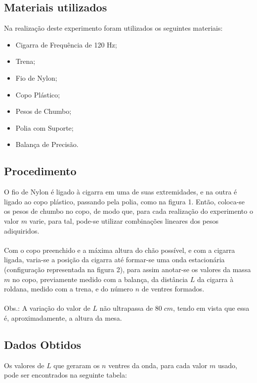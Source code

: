 \documentclass[12pt,a4paper]{article}
\begin{document}
\subsection{Materiais utilizados}
Na realização deste experimento foram utilizados os seguintes materiais:
\begin{itemize}
	\item Cigarra de Frequência de 120 Hz;
	\item Trena;
	\item Fio de Nylon;
	\item Copo Plástico;
	\item Pesos de Chumbo;
	\item Polia com Suporte;
	\item Balança de Precisão.
\end{itemize}

\subsection{Procedimento}
O fio de Nylon é ligado à cigarra em uma de suas extremidades, e na outra é ligado ao copo plástico, passando pela polia, como na figura 1. Então, coloca-se os pesos de chumbo no copo, de modo que, para cada realização do experimento o valor $m$ varie, para tal, pode-se utilizar combinações lineares dos pesos adiquiridos. \\\\
Com o copo preenchido e a máxima altura do chão possível, e com a cigarra ligada, varia-se a posição da cigarra até formar-se uma onda estacionária (configuração representada na figura 2), para assim anotar-se os valores da massa $m$ no copo, previamente medido com a balança, da distância $L$ da cigarra à roldana, medido com a trena, e do número $n$ de ventres formados. \\\\
Obs.: A variação do valor de $L$ não ultrapassa de $80 \; cm$, tendo em vista que essa é, aproximadamente, a altura da mesa.


\subsection{Dados Obtidos}
Os valores de $L$ que geraram os $n$ ventres da onda, para cada valor $m$ usado, pode ser encontrados na seguinte tabela:\\
\end{document}
